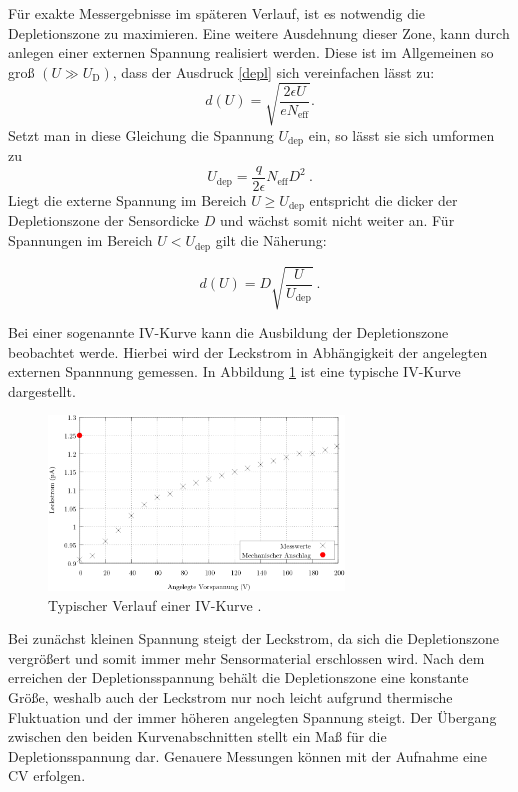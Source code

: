 Für exakte Messergebnisse im späteren Verlauf, ist es notwendig die Depletionszone zu maximieren. Eine weitere Ausdehnung dieser Zone, kann durch anlegen einer externen Spannung realisiert werden. Diese ist im Allgemeinen so groß $(U\gg U_\text{D})$, dass der Ausdruck \eqref{depl}
sich vereinfachen lässt zu:
\begin{equation}
    \label{dicke}
    d(U)=\sqrt{ \frac{ 2 \epsilon U }{e N_\text{eff}}}.
\end{equation}
Setzt man in diese Gleichung die Spannung $U_\text{dep}$ ein, so lässt sie sich umformen zu
\begin{equation}
    U_\text{dep}=\frac{q}{2 \epsilon} N_\text{eff}D^2 \:.
\end{equation}
Liegt die externe Spannung im Bereich $ U\geq U_\text{dep}$ entspricht die dicker der Depletionszone der Sensordicke $D$ und wächst somit nicht weiter an.
Für Spannungen im Bereich $U<U_\text{dep}$ gilt die Näherung:

\begin{equation}
    \label{depsu}
d(U)=D\sqrt{\frac{U}{U_\text{dep}}}\:.
\end{equation}

Bei einer sogenannte IV-Kurve kann die Ausbildung der Depletionszone beobachtet werde. Hierbei wird der Leckstrom in Abhängigkeit der angelegten externen Spannnung gemessen. In Abbildung \ref{IVKurve} ist eine typische IV-Kurve dargestellt.

\begin{figure}[H]
  \centering
  \includegraphics[width=0.7\textwidth]{ressources/IV.png}
  \caption{Typischer Verlauf einer IV-Kurve \cite{skript}.}
  \label{IVKurve}
\end{figure}

Bei zunächst kleinen Spannung steigt der Leckstrom, da sich die Depletionszone vergrößert und somit immer mehr Sensormaterial erschlossen wird. Nach dem erreichen der Depletionsspannung behält die Depletionszone eine konstante Größe, weshalb auch der Leckstrom nur noch leicht aufgrund thermische Fluktuation und der immer höheren angelegten Spannung steigt. Der Übergang zwischen den beiden Kurvenabschnitten stellt ein Maß für die Depletionsspannung dar. Genauere Messungen können mit der Aufnahme eine CV erfolgen.  

